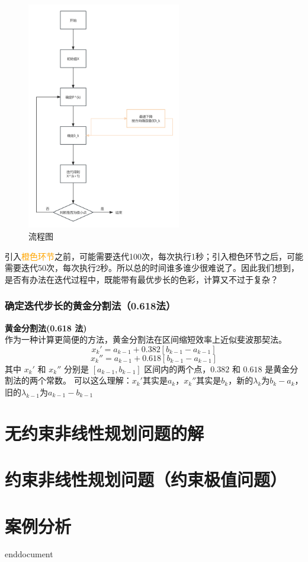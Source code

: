 \begin{figure}[H]
    \centering
    \includegraphics[width=0.6\textwidth]{./image/23.png}
    \caption{流程图}
    \label{fig:Chapter4_Temporary_Pavilion_1}
\end{figure}
引入\textcolor{orange}{橙色环节}之前，可能需要迭代100次，每次执行1秒；引入橙色环节之后，可能需要迭代50次，每次执行2秒。所以总的时间谁多谁少很难说了。因此我们想到，是否有办法在迭代过程中，既能带有最优步长的色彩，计算又不过于复杂？
\subsubsection{确定迭代步长的黄金分割法（0.618法）}
\label{确定迭代步长的黄金分割法}
\begin{notebox}{\textbf{黄金分割法(0.618 法)}}{}
    \\作为一种计算更简便的方法，黄金分割法在区间缩短效率上近似斐波那契法。
    \[
    x_k' = a_{k-1} + 0.382 [b_{k-1} - a_{k-1}]
    \]
    \[
    x_k'' = a_{k-1} + 0.618 [b_{k-1} - a_{k-1}]
    \]
    其中 $x_k'$ 和 $x_k''$ 分别是 $[a_{k-1}, b_{k-1}]$ 区间内的两个点，$0.382$ 和 $0.618$ 是黄金分割法的两个常数。
    可以这么理解：$x_k'$其实是$a_k$，$x_k''$其实是$b_k$，新的$\lambda_k$为$b_{k}-a_{k}$，旧的$\lambda_{k-1}$为$a_{k-1}-b_{k-1}$ 
\end{notebox}

\section{无约束非线性规划问题的解}
    \section{约束非线性规划问题（约束极值问题）}
    \section{案例分析}


\ifx\allfiles\undefined
	
	
	
	end{document}
	\else
	\fi